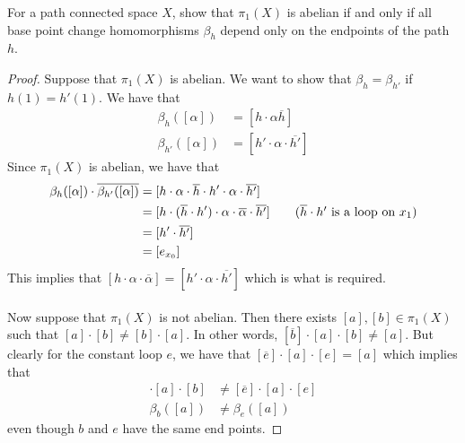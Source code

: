 \documentclass[a4paper]{article}
\begin{document}
\begin{ex}{}{} For a path connected space $X$, show that $\pi_1(X)$ is abelian if and only if all base point change homomorphisms $\beta_h$ depend only on the endpoints of the path $h$. \tcbline
\begin{proof}
Suppose that $\pi_1(X)$ is abelian. We want to show that $\beta_h=\beta_{h'}$ if $h(1)=h'(1)$. We have that 
\begin{align*}
\beta_h([\alpha])&=[h\cdot\alpha\overline{h}]\\
\beta_{h'}([\alpha])&=[h'\cdot\alpha\cdot\overline{h'}]
\end{align*}
Since $\pi_1(X)$ is abelian, we have that 
\begin{align*}
\beta_h([\alpha])\cdot\overline{\beta_{h'}([\alpha])}&=[h\cdot\alpha\cdot\overline{h}\cdot h'\cdot\alpha\cdot\overline{h'}]\\
&=[h\cdot(\overline{h}\cdot h')\cdot\alpha\cdot\overline{\alpha}\cdot\overline{h'}]\tag{$\overline{h}\cdot h'$ is a loop on $x_1$}\\
&=[h'\cdot\overline{h'}]\\
&=[e_{x_0}]
\end{align*}
This implies that $[h\cdot\alpha\cdot\overline{\alpha}]=[h'\cdot\alpha\cdot\overline{h'}]$ which is what is required. \\~\\

Now suppose that $\pi_1(X)$ is not abelian. Then there exists $[a],[b]\in\pi_1(X)$ such that $[a]\cdot[b]\neq[b]\cdot[a]$. In other words, $[\overline{b}]\cdot[a]\cdot[b]\neq[a]$. But clearly for the constant loop $e$, we have that $[\overline{e}]\cdot[a]\cdot[e]=[a]$ which implies that 
\begin{align*}
[\overline{b}]\cdot[a]\cdot[b]&\neq[\overline{e}]\cdot[a]\cdot[e]\\
\beta_b([a])&\neq\beta_e([a])
\end{align*}
even though $b$ and $e$ have the same end points. 
\end{proof}
\end{ex}
\end{document}
